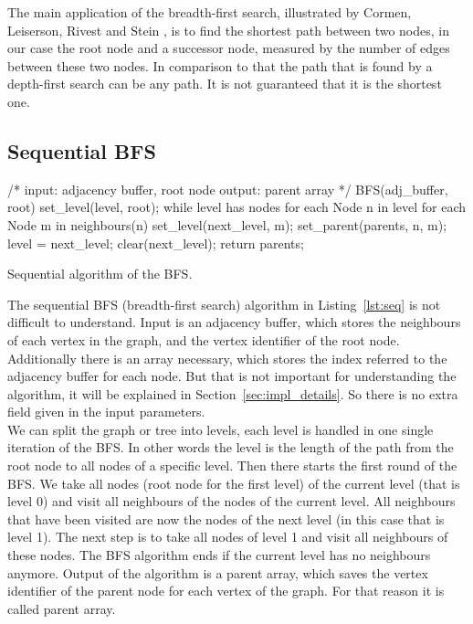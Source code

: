 \documentclass[12pt,a4paper]{article}
\begin{document}
The main application of the breadth-first search, illustrated by Cormen, Leiserson, Rivest and Stein \cite{cormen_introduction_2009}, is to find the shortest path between two nodes, in our case the root node and a successor node, measured by the number of edges between these two nodes. In comparison to that the path that is found by a depth-first search can be any path. It is not guaranteed that it is the shortest one.

\subsection{Sequential BFS}
\label{sec:sequential-bfs}

\begin{listing}[h]
\begin{ccode}
/*
input: adjacency buffer, root node
output: parent array
*/
BFS(adj_buffer, root){
	set_level(level, root);
	while level has nodes {
		for each Node n in level {
			for each Node m in neighbours(n){
				set_level(next_level, m);
				set_parent(parents, n, m);
			}
		}
		level = next_level;
		clear(next_level);
	}
	return parents;
}
\end{ccode}
\caption{Sequential algorithm of the BFS.}
\label{lst:seq}
\end{listing}

The sequential BFS (breadth-first search) algorithm in Listing~\ref{lst:seq} is not difficult to understand. Input is an adjacency buffer, which stores the neighbours of each vertex in the graph, and the vertex identifier of the root node. Additionally there is an array necessary, which stores the index referred to the adjacency buffer for each node. But that is not important for understanding the algorithm, it will be explained in Section~\ref{sec:impl_details}. So there is no extra field given in the input parameters. \\
We can split the graph or tree into levels, each level is handled in one single iteration of the BFS. In other words the level is the length of the path from the root node to all nodes of a specific level.
Then there starts the first round of the BFS. We take all nodes (root node for the first level) of the current level (that is level 0) and visit all neighbours of the nodes of the current level. All neighbours that have been visited are now the nodes of the next level (in this case that is level 1). The next step is to take all nodes of level 1 and visit all neighbours of these nodes. The BFS algorithm ends if the current level has no neighbours anymore. Output of the algorithm is a parent array, which saves the vertex identifier of the parent node for each vertex of the graph. For that reason it is called parent array.
\end{document}
